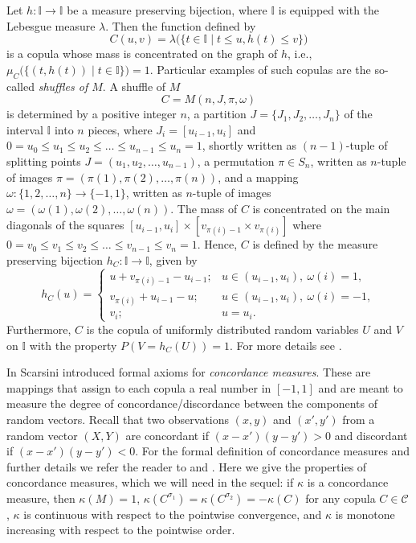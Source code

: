 \documentclass[12pt,a4paper]{amsart}
\theoremstyle{definition}
\newcommand{\II}{\mathbb{I}}
\newcommand{\CC}{\mathcal{C}}
\begin{document}
Let $h \colon \II \to \II$ be a measure preserving bijection, where $\II$ is equipped with the Lebesgue measure $\lambda$. Then the function defined by
\begin{equation}\label{eq:measure_preserving}
C(u,v)=\lambda\big(\{t \in \II \mid t\le u, h(t)\le v \}\big)
\end{equation}
is a copula whose mass is concentrated on the graph of $h$, i.e., $\mu_C\big(\{(t,h(t)) \mid t \in \II\}\big)=1$.
Particular examples of such copulas are the so-called
\emph{shuffles of $M$}. A shuffle of $M$
$$ C = M(n, J, \pi, \omega)$$
is determined by a positive integer $n$, a partition
$J=\{J_1,J_2,\ldots, J_n\}$ of the interval $\II$ into $n$ pieces, where $J_i=[u_{i-1},u_i]$ and $0 =u_0 \le u_1 \le u_2 \le \ldots \le u_{n-1} \le u_n=1$, shortly written as $(n-1)$-tuple of splitting points $J=(u_1, u_2, \ldots, u_{n-1})$,
a permutation $\pi \in S_n$, written as $n$-tuple of images $\pi = (\pi(1), \pi(2), \ldots, \pi(n))$, and a mapping $\omega: \{1, 2, \ldots, n\} \to \{-1, 1\}$, written as $n$-tuple of images $\omega = (\omega(1), \omega(2), \ldots, \omega(n))$. The mass of $C$ is concentrated on the main diagonals of the squares $[u_{i-1},u_i] \times  [v_{\pi(i)-1} \times v_{\pi(i)}]$ where $0= v_0 \le v_1 \le v_2\le \ldots \le v_{n-1} \le v_n = 1$. 
Hence, $C$ is defined by the measure preserving bijection $h_C \colon \II \to \II$, given by
$$ h_C(u) =  \begin{cases}
            u + v_{\pi(i)-1} - u_{i-1}; &  u \in (u_{i-1}, u_i),\ \omega(i) = 1, \\
            v_{\pi(i)} +  u_{i-1} - u; &  u \in (u_{i-1}, u_i),\ \omega(i) = -1, \\
            v_i; & u= u_i.
            \end{cases}
$$
Furthermore, $C$ is the copula of uniformly distributed random variables $U$ and $V$ on $\II$ with the property $P(V=h_C(U)) =1$. For more details see \cite[\S3.2.3]{Nels}.


In \cite{Scar} Scarsini introduced formal axioms for \emph{concordance measures}.
These are mappings that assign to each copula a real number in $[-1,1]$ and are meant to measure the degree of concordance/discordance between the components of random vectors.
Recall that two observations $(x,y)$ and $(x',y')$ from a random vector $(X,Y)$ are concordant if $(x-x')(y-y')>0$ and discordant if $(x-x')(y-y')<0$.
For the formal definition of concordance measures and further details we refer the reader to \cite{DuSe} and \cite{Nels}. Here we give the properties of concordance measures, which we will need in the sequel: if $\kappa$ is a concordance measure, then $\kappa(M) = 1$, $\kappa(C^{\sigma_1}) = \kappa(C^{\sigma_2}) = -\kappa(C)$ for any copula $C \in \CC$, $\kappa$ is continuous with respect to the pointwise convergence, and $\kappa$ is monotone increasing with respect to the pointwise order.
\end{document}
